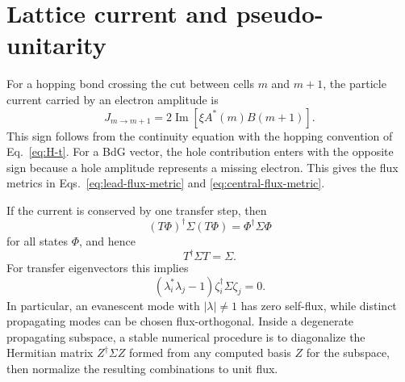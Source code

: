 \section{Lattice current and pseudo-unitarity}
\label{app:current-flux}

For a hopping bond crossing the cut between cells $m$ and $m+1$, the particle current carried by an electron amplitude is
\begin{equation}
    J_{m\to m+1}
    =
    2\operatorname{Im}\left[\xi A^*(m)B(m+1)\right].
    \label{eq:lattice-current-app}
\end{equation}
This sign follows from the continuity equation with the hopping convention of Eq.~\eqref{eq:H-t}.  For a BdG vector, the hole contribution enters with the opposite sign because a hole amplitude represents a missing electron.  This gives the flux metrics in Eqs.~\eqref{eq:lead-flux-metric} and \eqref{eq:central-flux-metric}.

If the current is conserved by one transfer step, then
\begin{equation}
    (T\Phi)^\dagger\Sigma(T\Phi)=\Phi^\dagger\Sigma\Phi
\end{equation}
for all states $\Phi$, and hence
\begin{equation}
    T^\dagger\Sigma T=\Sigma.
\end{equation}
For transfer eigenvectors this implies
\begin{equation}
    \left(\lambda_i^*\lambda_j-1\right)
    \zeta_i^\dagger\Sigma\zeta_j=0.
\end{equation}
In particular, an evanescent mode with $|\lambda|\ne1$ has zero self-flux, while distinct propagating modes can be chosen flux-orthogonal.  Inside a degenerate propagating subspace, a stable numerical procedure is to diagonalize the Hermitian matrix $Z^\dagger\Sigma Z$ formed from any computed basis $Z$ for the subspace, then normalize the resulting combinations to unit flux.
